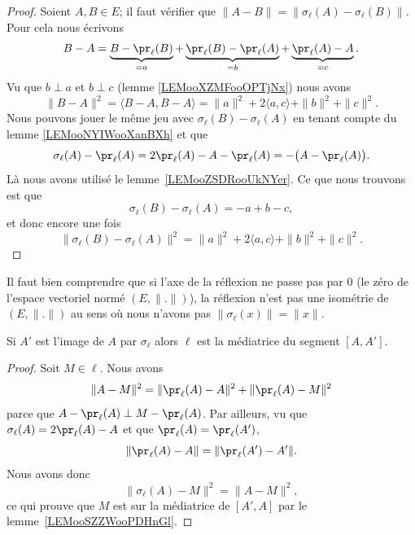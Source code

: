 \begin{proof}
	Soient \( A,B\in E\); il faut vérifier que \( \| A-B \|=\| \sigma_{\ell}(A)-\sigma_{\ell}(B) \|\). Pour cela nous écrivons
	\begin{equation}
		B-A=\underbrace{B-\pr_{\ell}(B)}_{=a}+\underbrace{\pr_{\ell}(B)-\pr_{\ell}(A)}_{=b}+\underbrace{\pr_{\ell}(A)-A}_{=c}.
	\end{equation}
	Vu que \( b\perp a\) et \( b\perp c\) (lemme \ref{LEMooXZMFooOPTjNx}) nous avons
	\begin{equation}
		\| B-A \|^2=\langle B-A, B-A\rangle =\| a \|^2+2\langle a, c\rangle +\| b \|^2+\| c \|^2.
	\end{equation}
	Nous pouvons jouer le même jeu avec \( \sigma_{\ell}(B)-\sigma_{\ell}(A)\) en tenant compte du lemme \ref{LEMooNYIWooXanBXh} et que
	\begin{equation}
		\sigma_{\ell}(A)-\pr_{\ell}(A)=2\pr_{\ell}(A)-A-\pr_{\ell}(A)=-\big( A-\pr_{\ell}(A) \big).
	\end{equation}
	Là nous avons utilisé le lemme~\ref{LEMooZSDRooUkNYer}. Ce que nous trouvons est que
	\begin{equation}
		\sigma_{\ell}(B)-\sigma_{\ell}(A)=-a+b-c,
	\end{equation}
	et donc encore une fois
	\begin{equation}
		\| \sigma_{\ell}(B)-\sigma_{\ell}(A) \|^2=\| a \|^2+2\langle a, c\rangle +\| b \|^2+\| c \|^2.
	\end{equation}
\end{proof}

\begin{remark}
	Il faut bien comprendre que si l'axe de la réflexion ne passe pas par \( 0\) (le zéro de l'espace vectoriel normé \( (E,\| . \|)\)), la réflexion n'est pas une isométrie de \( (E,\| . \|)\) au sens où nous n'avons pas \( \| \sigma_{\ell}(x) \|=\| x \|\).
\end{remark}


\begin{lemma}       \label{LEMooTCIEooXdyuHu}
	Si \( A'\) est l'image de \( A\) par \( \sigma_{\ell}\) alors \( \ell\) est la médiatrice du segment \( [A,A']\).
\end{lemma}

\begin{proof}
	Soit \( M\in\ell\). Nous avons
	\begin{equation}
		\| A-M \|^2=\| \pr_{\ell}(A)-A \|^2+\| \pr_{\ell}(A)-M \|^2
	\end{equation}
	parce que \( A-\pr_{\ell}(A)\perp M-\pr_{\ell}(A)\). Par ailleurs, vu que \( \sigma_{\ell}(A)=2\pr_{\ell}(A)-A\) et que \( \pr_{\ell}(A)=\pr_{\ell}(A')\),
	\begin{equation}
		\| \pr_{\ell}(A)-A \|=\| \pr_{\ell}(A')-A' \|.
	\end{equation}
	Nous avons donc
	\begin{equation}
		\| \sigma_{\ell}(A)-M \|^2=\| A-M \|^2,
	\end{equation}
	ce qui prouve que \( M\) est sur la médiatrice de \( [A',A]\) par le lemme~\ref{LEMooSZZWooPDHnGl}.
\end{proof}

